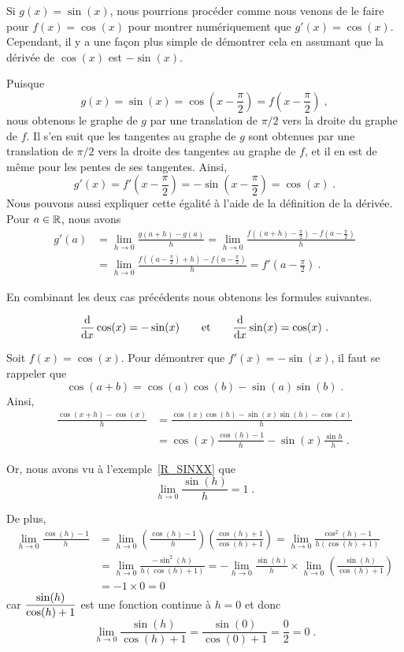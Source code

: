 {Si $g(x) = \sin(x)$, nous pourrions procéder comme nous venons de le faire
pour $f(x)=\cos(x)$ pour montrer numériquement que
$g'(x) = \cos(x)$.  Cependant, il y a une façon plus simple de
démontrer cela en assumant que la dérivée de $\cos(x)$ est
$-\sin(x)$.

Puisque
\[
g(x) = \sin(x) = \cos\left(x-\frac{\pi}{2}\right) =
f\left(x-\frac{\pi}{2}\right) \; ,
\]
nous obtenons le graphe de $g$ par une translation de $\pi/2$
vers la droite du graphe de $f$.  Il s'en suit que les tangentes au
graphe de $g$ sont obtenues par une translation de $\pi/2$
vers la droite des tangentes au graphe de $f$, et il en est de même
pour les pentes de ses tangentes.  Ainsi,
\[
g'(x) = f'\left(x - \frac{\pi}{2}\right) =
-\sin\left(x - \frac{\pi}{2}\right) = \cos(x) \; .
\]
Nous pouvons aussi expliquer cette égalité à l'aide de la définition de la
dérivée.  Pour $a\in \RR$, nous avons
\begin{align*}
g'(a) &= \lim_{h\rightarrow 0} \frac{g(a+h)-g(a)}{h}
= \lim_{h\rightarrow 0} \frac{f\left((a+h)-\frac{\pi}{2}\right) -
f\left(a-\frac{\pi}{2}\right)}{h} \\
&= \lim_{h\rightarrow 0} \frac{f\left(\left(a-\frac{\pi}{2}\right) + h \right)
- f\left(a-\frac{\pi}{2}\right)}{h}
= f'\left(a-\frac{\pi}{2}\right) \ .
\end{align*}

En combinant les deux cas précédents nous obtenons les formules suivantes.

\begin{prop}
\[
\dfdx{\cos(x)}{x} = -\sin(x) \qquad \text{et} \qquad
\dfdx{\sin(x)}{x} = \cos(x) \ .
\]
\end{prop}

Soit $f(x) = \cos(x)$.  Pour démontrer que $f'(x) = -\sin(x)$, il faut
se rappeler que
\[
\cos(a+b) = \cos(a)\cos(b) - \sin(a)\sin(b) \; .
\]
Ainsi,
\begin{align*}
\frac{\cos(x+h)-\cos(x)}{h}
&= \frac{\cos(x)\cos(h) - \sin(x)\sin(h) - \cos(x)}{h} \\
&= \cos(x) \frac{\cos(h)-1}{h} - \sin(x) \frac{\sin{h}}{h} \; .
\end{align*}

Or, nous avons vu à l'exemple~\ref{R_SINXX} que
\[
\lim_{h\rightarrow 0} \frac{\sin(h)}{h} =1 \; .
\]

De plus,
\begin{align*}
\lim_{h\rightarrow 0} \frac{\cos(h)-1}{h}
&= \lim_{h\rightarrow 0} \left(\frac{\cos(h)-1}{h}\right)
\left(\frac{\cos(h)+1}{\cos(h)+1}\right)
= \lim_{h\rightarrow 0}\frac{\cos^2(h)-1}{h(\cos(h)+1)} \\
&= \lim_{h\rightarrow 0} \frac{-\sin^2(h)}{h(\cos(h)+1)}
= -\lim_{h\rightarrow 0} \frac{\sin(h)}{h}
\times \lim_{h\rightarrow 0} \left(\frac{\sin(h)}{\cos(h)+1}\right) \\
&= - 1 \times 0 = 0
\end{align*}
car $\DS \frac{\sin(h)}{\cos(h)+1}$ est une fonction
continue à $h=0$ et donc
\[
\lim_{h\rightarrow 0} \frac{\sin(h)}{\cos(h)+1}=
\frac{\sin(0)}{\cos(0)+1} = \frac{0}{2} = 0 \; .
\]

}
